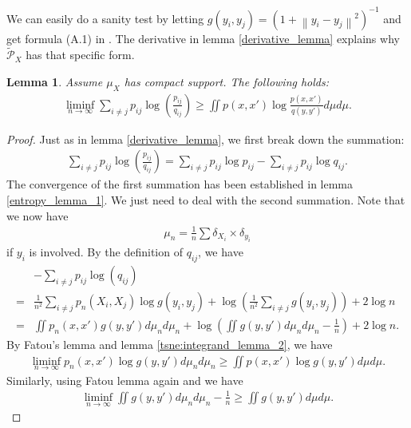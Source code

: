 \documentclass[10pt]{article}
\newcommand{\norm}[1]{\left\lVert#1\right\rVert}
\newtheorem{lemma}{\bf Lemma}
\newenvironment{Proof of lemma}{\noindent{\bf Proof of Lemma}}{\hfill$\Box$\newline}
\newenvironment{Proof of claim}{\noindent{\bf Proof of claim}}{\hfill$\Box$\newline}
\newenvironment{Proof of theorem}{\noindent{\bf Proof of Theorem}}{\hfill\scriptsize{$\Box$}\newline}
\newenvironment{Proof of theorems}{\noindent{\bf Proof of Theorems}}{\hfill$\Box$\newline}
\newenvironment{Proof of proposition}{\noindent{\bf Proof of Proposition}}{\hfill$\Box$\newline}
\newenvironment{Proof of propositions}{\noindent{\bf Proof of Propositions}}{\hfill$\Box$\newline}
\newenvironment{Proof of exercise}{\noindent{\it Proof of Exercise:}}{\hfill$\Box$}
\numberwithin{equation}{section}
\begin{document}
We can easily do a sanity test by letting $g(y_i,y_j) = (1+\norm{y_i-y_j}^2)^{-1}$ and get formula (A.1) in \cite{auffinger-tsne}. The derivative in lemma \ref{derivative_lemma} explains why
$\tilde{\mathcal{{P}}}_X$ has that specific form.
\begin{lemma} \label{lower_bound_lemma_2}
    Assume $\mu_X$ has compact support. The following holds:
    \begin{align}
        \liminf_{n \to \infty}\sum_{i \neq j} p_{ij} \log \left(\frac{p_{ij}}{q_{ij}}\right) \geq \iint p(x,x')\log \frac{p(x,x')}{q(y,y')} d\mu d\mu.
    \end{align}
\end{lemma}
\begin{proof}
    Just as in lemma \ref{derivative_lemma}, we first break down the summation:
    \begin{align}
        \sum_{i \neq j} p_{ij} \log \left(\frac{p_{ij}}{q_{ij}}\right) = \sum_{i \neq j} p_{ij} \log p_{ij} - \sum_{i \neq j} p_{ij} \log q_{ij}.
    \end{align}
    The convergence of the first summation has been established in lemma \ref{entropy_lemma_1}. We just need to deal with the second summation. Note that we now have
    \begin{align}
        \mu_n = \frac{1}{n} \sum \delta_{X_i} \times \delta_{y_i}
    \end{align}
    if $y_i$ is involved. By the definition of $q_{ij}$, we have
    \begin{align} \label{entropy_esti_2}
          & -\sum_{i \neq j}p_{ij} \log(q_{ij}) \nonumber                                                                                             \\
        = & \frac{1}{n^2}\sum_{i \neq j} p_n(X_i,X_j) \log g(y_i,y_j) + \log \left(\frac{1}{n^2}\sum_{i \neq j} g(y_i,y_j)\right) +2 \log n \nonumber \\
        = & \iint p_n(x,x')g(y,y')d\mu_n d\mu_n + \log \left(\iint g(y,y')d\mu_n d\mu_n - \frac{1}{n}\right)+2\log n.
    \end{align}
    By Fatou's lemma and lemma \ref{tsne:integrand_lemma_2}, we have
    \begin{align} \label{fatou_esti_1}
        \liminf_{n \to \infty} p_n(x,x')\log g(y,y') d\mu_n d\mu_n \geq  \iint p(x,x')\log g(y,y') d\mu d\mu.
    \end{align}
    Similarly, using Fatou lemma again and we have
    \begin{align} \label{fatou_esti_2}
        \liminf_{n \to \infty} \iint g(y,y') d\mu_n d\mu_n - \frac{1}{n} \geq \iint g(y,y')d\mu d\mu.

\end{align}
\end{proof}
\end{document}
